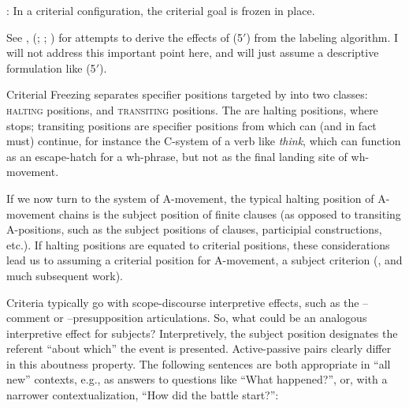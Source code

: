 \documentclass[output=paper]{langsci/langscibook}
\begin{document}
\begin{exe}
     : In a criterial configuration, the criterial
    goal is frozen in place.\label{ex:key:21.5prime}
\z

See \textcite{Chomsky2013,Chomsky2015}, \citeauthor{Rizzi2015}
(\citeyear{Rizzi2015}; \citeyear{Rizzi2015b}; \citeyear{Rizzi2016a}) for
attempts to derive the effects of (5$'$) from the labeling algorithm. I will not
address this important point here, and will just assume a descriptive
formulation like (5$'$).

Criterial Freezing separates specifier positions
targeted by  into two classes: \textsc{halting} positions, and
\textsc{transiting} positions. The  are halting
positions, where  stops; transiting positions are specifier positions
from which  can (and in fact must) continue, for instance the C-system
of a verb like \emph{think}, which can function as an escape-hatch for a
wh-phrase, but not as the final landing site of wh-movement.

If we now turn to the system of A-movement, the typical halting position of
A-movement chains is the subject position of finite clauses (as opposed to
transiting A-positions, such as the subject positions of  clauses,
participial constructions, etc.). If halting positions are equated to criterial
positions, these considerations lead us to assuming a criterial position for
A-movement, a subject criterion (\citealt{rizzicriterial}, and much subsequent
work).

Criteria typically go with scope-discourse interpretive effects, such as the
--comment or --presupposition articulations. So, what could be an
analogous interpretive effect for subjects? Interpretively, the subject
position designates the referent “about which” the event is presented.
Active-passive pairs clearly differ in this aboutness property. The following
sentences are both appropriate in “all new” contexts, e.g., as answers to
questions like “What happened?”, or, with a narrower contextualization, “How
did the battle start?”:


\end{exe}
\end{document}
